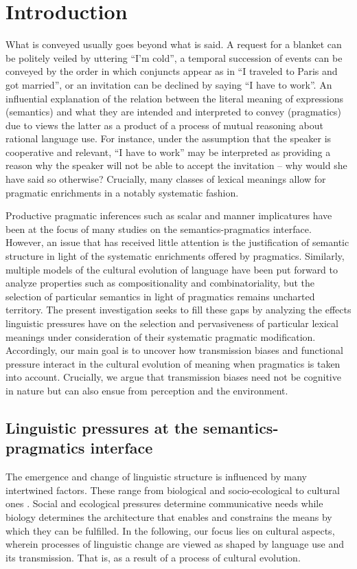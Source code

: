 \documentclass[a4paper]{article}
\begin{document}
\section{Introduction}\label{sec:introduction}
What is conveyed usually goes beyond what is said. A request for a blanket can be politely veiled by uttering ``I'm cold'', a temporal succession of events can be conveyed by the order in which conjuncts appear as in ``I traveled to Paris and got married'', or an invitation can be declined by saying ``I have to work''. An influential explanation of the relation between the literal meaning of expressions (semantics) and what they are intended and interpreted to convey (pragmatics) due to \citet{grice:1975} views the latter as a product of a process of mutual reasoning about rational language use. For instance, under the assumption that the speaker is cooperative and relevant, ``I have to work'' may be interpreted as providing a reason why the speaker will not be able to accept the invitation -- why would she have said so otherwise? Crucially, many classes of lexical meanings allow for pragmatic enrichments in a notably systematic fashion. 

Productive pragmatic inferences such as scalar and manner implicatures have been at the focus of many studies on the semantics-pragmatics interface. However, an issue that has received little attention is the justification of semantic structure in light of the systematic enrichments offered by pragmatics. Similarly, multiple models of the cultural evolution of language have been put forward to analyze properties such as compositionality and combinatoriality, but the selection of particular semantics in light of pragmatics remains uncharted territory. The present investigation seeks to fill these gaps by analyzing the effects linguistic pressures have on the selection and pervasiveness of particular lexical meanings under consideration of their systematic pragmatic modification. Accordingly, our main goal is to uncover how transmission biases and functional pressure interact in the cultural evolution of meaning when pragmatics is taken into account. Crucially, we argue that transmission biases need not be cognitive in nature but can also ensue from perception and the environment.  


\subsection{Linguistic pressures at the semantics-pragmatics interface}
The emergence and change of linguistic structure is influenced by many intertwined factors. These range from biological and socio-ecological to cultural ones \citep{steels:2011}. Social and ecological pressures determine communicative needs while biology determines the architecture that enables and constrains the means by which they can be fulfilled. In the following, our focus lies on cultural aspects, wherein processes of linguistic change are viewed as shaped by language use and its transmission. That is, as a result of a process of cultural evolution. 
\end{document}
